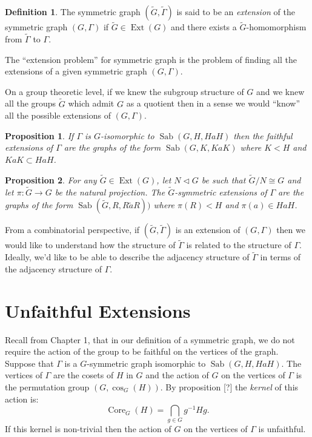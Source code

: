 \documentclass[12pt]{amsart}
\theoremstyle{plain}
\newtheorem{proposition}{Proposition}
\theoremstyle{definition}
\newtheorem{definition}{Definition}
\theoremstyle{remark}
\DeclareMathOperator{\core}{Core}
\DeclareMathOperator{\sab}{Sab}
\DeclareMathOperator{\ext}{Ext}
\begin{document}
\begin{definition}
The symmetric graph $(\widetilde{G},\widetilde{\Gamma})$
is said to be an {\it extension} of the symmetric graph $(G,\Gamma)$
if $\widetilde{G} \in \ext(G)$
and there exists a $\widetilde{G}$-homomorphism
from $\widetilde{\Gamma}$ to $\Gamma$.
\end{definition}

The ``extension problem'' for symmetric graph
is the problem of finding all the extensions
of a given symmetric graph $(G,\Gamma)$.

On a group theoretic level, if we knew the subgroup structure of $G$
and we knew all the groups $\widetilde{G}$ which admit $G$ as a 
quotient then in a sense we would ``know'' all the possible 
extensions of $(G,\Gamma)$.

\begin{proposition}
If $\Gamma$ is $G$-isomorphic to $\sab(G,H,HaH)$
then the faithful extensions of $\Gamma$
are the graphs of the form $\sab(G,K,KaK)$
where $K < H$ and $KaK \subset HaH$.
\end{proposition}

\begin{proposition}
For any $\widetilde{G} \in \ext(G)$, let $N \triangleleft G$
be such that $\widetilde{G}/N \cong G$
and let $\pi : \widetilde{G} \to G$ be the natural projection.
The $\widetilde{G}$-symmetric extensions of $\Gamma$
are the graphs of the form 
$\sab(\widetilde{G},R,R\widetilde{a}R))$
where $\pi(R) < H$ and $\pi(a) \in HaH$.
\end{proposition}

From a combinatorial perspective, 
if $(\widetilde{G},\widetilde{\Gamma})$ 
is an extension of $(G,\Gamma)$
then we would like to understand
how the structure of $\widetilde{\Gamma}$
is related to the structure of $\Gamma$.
Ideally, we'd like to be able to describe the adjacency
structure of $\widetilde{\Gamma}$ in terms of the
adjacency structure of $\Gamma$.

\section{Unfaithful Extensions}

Recall from Chapter 1, that in our definition of a symmetric
graph, we do not require the action of the group
to be faithful on the vertices of the graph.
Suppose that $\Gamma$ is a $G$-symmetric graph
isomorphic to $\sab(G,H,HaH)$.
The vertices of $\Gamma$ are the cosets of $H$ in $G$
and the action of $G$ on the vertices of $\Gamma$
is the permutation group $(G,\cos_G(H))$.
By proposition [?] the {\it kernel} of this action is:
$$\core_G(H) = \bigcap_{g \in G} g^{-1}Hg.$$
If this kernel is non-trivial then the action of $G$
on the vertices of $\Gamma$ is unfaithful.
\end{document}
